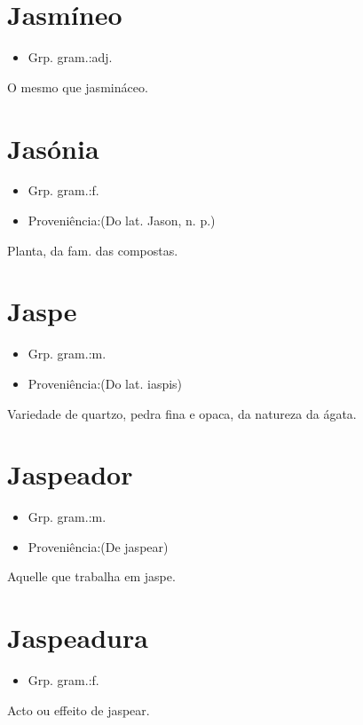 \documentclass{article}
\begin{document}
\section{Jasmíneo}
\begin{itemize}
\item {Grp. gram.:adj.}
\end{itemize}
O mesmo que \textunderscore jasmináceo\textunderscore .
\section{Jasónia}
\begin{itemize}
\item {Grp. gram.:f.}
\end{itemize}
\begin{itemize}
\item {Proveniência:(Do lat. \textunderscore Jason\textunderscore , n. p.)}
\end{itemize}
Planta, da fam. das compostas.
\section{Jaspe}
\begin{itemize}
\item {Grp. gram.:m.}
\end{itemize}
\begin{itemize}
\item {Proveniência:(Do lat. \textunderscore iaspis\textunderscore )}
\end{itemize}
Variedade de quartzo, pedra fina e opaca, da natureza da ágata.
\section{Jaspeador}
\begin{itemize}
\item {Grp. gram.:m.}
\end{itemize}
\begin{itemize}
\item {Proveniência:(De \textunderscore jaspear\textunderscore )}
\end{itemize}
Aquelle que trabalha em jaspe.
\section{Jaspeadura}
\begin{itemize}
\item {Grp. gram.:f.}
\end{itemize}
Acto ou effeito de jaspear.
\end{document}
